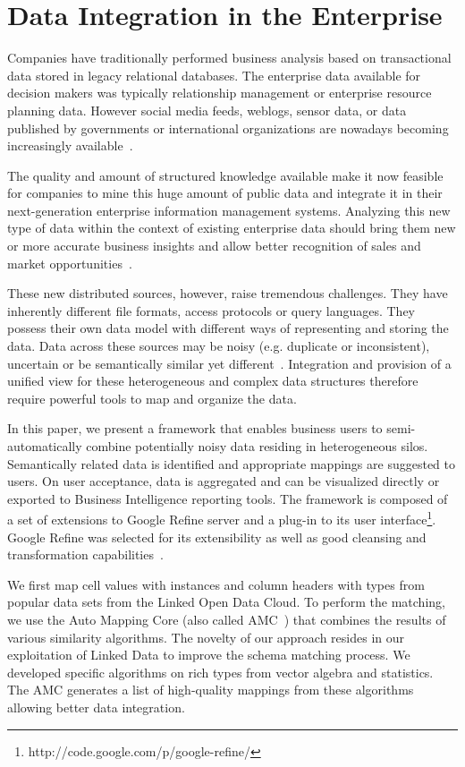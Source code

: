 \chapter{Data Integration in the Enterprise}\label{chapter:rubix}
\graphicspath{{Part2/Chapter1/figures/}}

Companies have traditionally performed business analysis based on transactional data stored in legacy relational databases. The enterprise data available for decision makers was typically relationship management or enterprise resource planning data. However social media feeds, weblogs, sensor data, or data published by governments or international organizations are nowadays becoming increasingly available~\cite{Boyd:Article:11}.

The quality and amount of structured knowledge available make it now feasible for companies to mine this huge amount of public data and integrate it in their next-generation enterprise information management systems. Analyzing this new type of data within the context of existing enterprise data should bring them new or more accurate business insights and allow better recognition of sales and market opportunities~\cite{LaValle:MIT:11}.

These new distributed sources, however, raise tremendous challenges. They have inherently different file formats, access protocols or query languages. They possess their own data model with different ways of representing and storing the data. Data across these sources may be noisy (e.g. duplicate or inconsistent), uncertain or be semantically similar yet different~\cite{Avitha:EuroJorunal:11}. Integration and provision of a unified view for these heterogeneous and complex data structures therefore require powerful tools to map and organize the data.

In this paper, we present a framework that enables business users to semi-automatically combine potentially noisy data residing in heterogeneous silos. Semantically related data is identified and appropriate mappings are suggested to users. On user acceptance, data is aggregated and can be visualized directly or exported to Business Intelligence reporting tools. The framework is composed of a set of extensions to Google Refine server and a plug-in to its user interface\footnote{http://code.google.com/p/google-refine/}. Google Refine was selected for its extensibility as well as good cleansing and transformation capabilities~\cite{Bizer:IJSWIS:09}.

We first map cell values with instances and column headers with types from popular data sets from the Linked Open Data Cloud. To perform the matching, we use the Auto Mapping Core (also called AMC~\cite{Peukert:ICDE:12}) that combines the results of various similarity algorithms. The novelty of our approach resides in our exploitation of Linked Data to improve the schema matching process. We developed specific algorithms on rich types from vector algebra and statistics. The AMC generates a list of high-quality mappings from these algorithms allowing better data integration.

